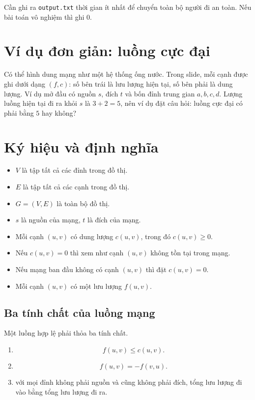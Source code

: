 \documentclass[11pt]{article}
\begin{document}
Cần ghi ra \texttt{output.txt} thời gian ít nhất để chuyển toàn bộ người đi an
toàn. Nếu bài toán vô nghiệm thì ghi $0$.

\section{Ví dụ đơn giản: luồng cực đại}

Có thể hình dung mạng như một hệ thống ống nước. Trong slide, mỗi cạnh được
ghi dưới dạng $(f,c)$: số bên trái là lưu lượng hiện tại, số bên phải là dung
lượng. Ví dụ mở đầu có nguồn $s$, đích $t$ và bốn đỉnh trung gian
$a,b,c,d$. Lượng luồng hiện tại đi ra khỏi $s$ là $3+2=5$, nên ví dụ đặt câu
hỏi: luồng cực đại có phải bằng $5$ hay không?

\section{Ký hiệu và định nghĩa}

\begin{itemize}
  \item $V$ là tập tất cả các đỉnh trong đồ thị.
  \item $E$ là tập tất cả các cạnh trong đồ thị.
  \item $G=(V,E)$ là toàn bộ đồ thị.
  \item $s$ là nguồn của mạng, $t$ là đích của mạng.
  \item Mỗi cạnh $(u,v)$ có dung lượng $c(u,v)$, trong đó $c(u,v)\ge 0$.
  \item Nếu $c(u,v)=0$ thì xem như cạnh $(u,v)$ không tồn tại trong mạng.
  \item Nếu mạng ban đầu không có cạnh $(u,v)$ thì đặt $c(u,v)=0$.
  \item Mỗi cạnh $(u,v)$ có một lưu lượng $f(u,v)$.
\end{itemize}

\subsection{Ba tính chất của luồng mạng}

Một luồng hợp lệ phải thỏa ba tính chất.

\begin{enumerate}
  \item {}
  \[
    f(u,v)\le c(u,v).
  \]
  \item {}
  \[
    f(u,v)=-f(v,u).
  \]
  \item {} với mọi đỉnh không phải nguồn và cũng không
  phải đích, tổng lưu lượng đi vào bằng tổng lưu lượng đi ra.
\end{enumerate}
\end{document}
